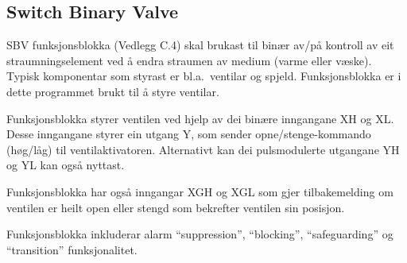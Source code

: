 \newpage

\subsection{Switch Binary Valve}

\gls{SBV} funksjonsblokka (Vedlegg C.4) skal brukast til binær av/på kontroll av eit straumningselement ved å endra straumen av medium (varme eller væske). 
Typisk komponentar som styrast er bl.a.\ ventilar og spjeld.
Funksjonsblokka er i dette programmet brukt til å styre ventilar.

Funksjonsblokka styrer ventilen ved hjelp av dei binære inngangane \gls{XH} og \gls{XL}.\@
Desse inngangane styrer ein utgang Y, som sender opne/stenge-kommando (høg/låg) til ventilaktivatoren.
Alternativt kan dei pulsmodulerte utgangane \gls{YH} og \gls{YL} kan også nyttast.

Funksjonsblokka har også inngangar \gls{XGH} og \gls{XGL} som gjer tilbakemelding om ventilen er heilt open eller stengd
som bekrefter ventilen sin posisjon.


Funksjonsblokka inkluderar alarm ``suppression'', ``blocking'', ``safeguarding'' og ``transition'' funksjonalitet.

